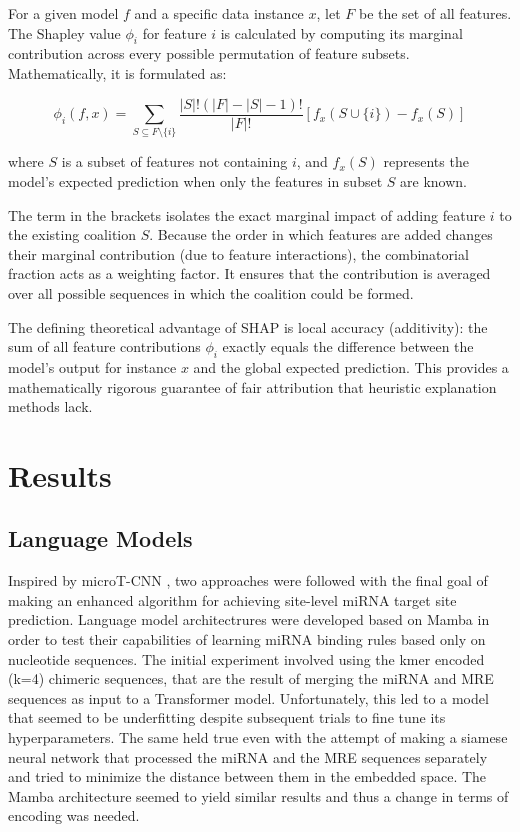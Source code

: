 \documentclass[en,ack]{dimscthesis}
\begin{document}
For a given model $f$ and a specific data instance $x$, let $F$ be the set of all features. The Shapley value $\phi_i$ for feature $i$ is calculated by computing its marginal contribution across every possible permutation of feature subsets. Mathematically, it is formulated as:

\begin{equation}
	\phi_i(f, x) = \sum_{S \subseteq F \setminus \{i\}} \frac{|S|! \left( |F| - |S| - 1 \right)!}{|F|!} \left[ f_x(S \cup \{i\}) - f_x(S) \right]
\end{equation}

where $S$ is a subset of features not containing $i$, and $f_x(S)$ represents the model's expected prediction when only the features in subset $S$ are known. 

The term in the brackets isolates the exact marginal impact of adding feature $i$ to the existing coalition $S$. Because the order in which features are added changes their marginal contribution (due to feature interactions), the combinatorial fraction acts as a weighting factor. It ensures that the contribution is averaged over all possible sequences in which the coalition could be formed.

The defining theoretical advantage of SHAP is local accuracy (additivity): the sum of all feature contributions $\phi_i$ exactly equals the difference between the model's output for instance $x$ and the global expected prediction. This provides a mathematically rigorous guarantee of fair attribution that heuristic explanation methods lack.

\chapter{Results}
\label{sec:Results}
\section{Language Models}
\par Inspired by microT-CNN \parencite{zacharopoulouMicroTCNNAvantgardeDeep2024}, two approaches were followed with the final goal of making an enhanced algorithm for achieving site-level miRNA target site prediction. Language model architectrures were developed based on Mamba in order to test their capabilities of learning miRNA binding rules based only on nucleotide sequences. The initial experiment involved using the kmer encoded (k=4) chimeric sequences, that are the result of merging the miRNA and MRE sequences as input to a Transformer model. Unfortunately, this led to a model that seemed to be underfitting despite subsequent trials to fine tune its hyperparameters. The same held true even with the attempt of making a siamese neural network that processed the miRNA and the MRE sequences separately and tried to minimize the distance between them in the embedded space. The Mamba architecture seemed to yield similar results and thus a change in terms of encoding was needed.
\end{document}
